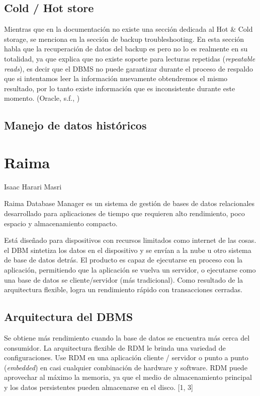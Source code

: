 \documentclass{acmart}
\begin{document}
\subsection{Cold / Hot store}
Mientras que en la documentación no existe una sección dedicada al Hot \& Cold storage, se menciona en la sección de backup troubleshooting. En esta sección habla que la recuperación de datos del backup es  pero no lo es realmente en su totalidad, ya que explica que no existe soporte para lecturas repetidas (\textit{repeatable reads}), es decir que el DBMS no puede garantizar durante el proceso de respaldo que si intentamos leer la información nuevamente obtendremos el mismo resultado, por lo tanto existe información que es inconsistente durante este momento. (Oracle, s.f., \cite{mysqlhot})

\subsection{Manejo de datos históricos}

\newpage

\section{Raima}
Isaac Harari Masri

Raima Database Manager es un sistema de gestión de bases de datos relacionales desarrollado para aplicaciones de tiempo que requieren alto rendimiento, poco espacio y almacenamiento compacto.

Está diseñado para dispositivos con recursos limitados como internet de las cosas. el DBM sintetiza los datos en el dispositivo y se envían a la nube u otro sistema de base de datos detrás. El producto es capaz de ejecutarse en proceso con la aplicación, permitiendo que la aplicación se vuelva un servidor, o ejecutarse como una base de datos se cliente/servidor (más tradicional). Como resultado de la arquitectura flexible, logra un rendimiento rápido con transacciones cerradas.
\subsection{Arquitectura del DBMS}
Se obtiene más rendimiento cuando la base de datos se encuentra más cerca del consumidor. La arquitectura flexible de RDM le brinda una variedad de configuraciones. Use RDM en una aplicación cliente / servidor o punto a punto (\textit{embedded}) en casi cualquier combinación de hardware y software. RDM puede aprovechar al máximo la memoria, ya que el medio de almacenamiento principal y los datos persistentes pueden almacenarse en el disco. [1, 3]
\end{document}
